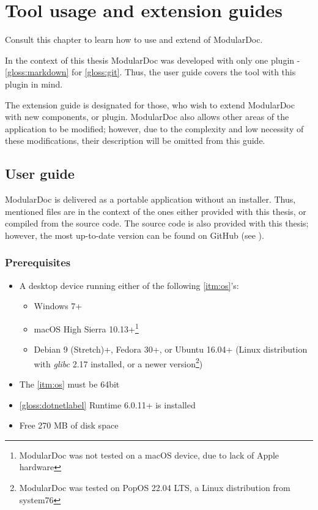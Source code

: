 \chapter{Tool usage and extension guides}

Consult this chapter to learn how to use and extend of ModularDoc.

In the context of this thesis ModularDoc was developed with only one plugin - \ref{gloss:markdown} for \ref{gloss:git}.
Thus, the user guide covers the tool with this plugin in mind.

The extension guide is designated for those, who wish to extend ModularDoc with new components, or plugin. ModularDoc also allows other areas of the application to be modified; however, due to the complexity and low necessity of these modifications, their description will be omitted from this guide.

\section{User guide}

ModularDoc is delivered as a portable application without an installer. Thus, mentioned files are in the context of the ones either provided with this thesis, or compiled from the source code. The source code is also provided with this thesis; however, the most up-to-date version can be found on GitHub (see ).

\subsection{Prerequisites}

\begin{itemize}
    \item A desktop device running either of the following \ref{itm:os}'s:
    \begin{itemize}
        \item Windows 7+
        \item macOS High Sierra 10.13+\footnote{ModularDoc was not tested on a macOS device, due to lack of Apple hardware}
        \item  Debian 9 (Stretch)+, Fedora 30+, or Ubuntu 16.04+ (Linux distribution with \textit{glibc} 2.17 installed, or a newer version\footnote{ModularDoc was tested on PopOS 22.04 LTS, a Linux distribution from system76})
    \end{itemize}
    \item The \ref{itm:os} must be 64bit
    \item \ref{gloss:dotnetlabel} Runtime 6.0.11+ is installed
    \item Free 270 MB of disk space
\end{itemize}

